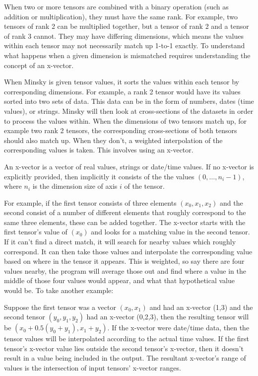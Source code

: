 When two or more tensors are combined with a binary operation (such 
as addition or multiplication), they must have the same rank. For example,
two tensors of rank 2 can be multiplied together, but a tensor of rank 2 and 
a tensor of rank 3 cannot. They may have differing dimensions, which means
the values within each tensor may not necessarily match up 1-to-1 exactly.
To understand what happens when a given dimension is mismatched requires 
understanding the concept of an x-vector\label{x-vector}.

When Minsky is given tensor values, it sorts the values within each tensor
by corresponding dimensions. For example, a rank 2 tensor would have its
values sorted into two sets of data. This data can be in the form of numbers,
dates (time values), or strings. Minsky will then look at cross-sections of the
datasets in order to process the values within. When the dimensions of two
tensors match up, for example two rank 2 tensors, the corresponding
cross-sections of both tensors should also match up. When they don't, a
weighted interpolation of the corresponding values is taken. This involves
using an x-vector. 

An x-vector is a vector of real values, strings or date/time values. 
If no x-vector is explicitly provided, then implicitly it consists of the the values
$(0,\ldots,n_i-1)$, where $n_i$ is the dimension size of axis $i$
of the tensor.

For example, if the first tensor consists of three elements $(x_0, x_1, x_2)$
and the second consist of a number of different elements that roughly
correspond to the same three elements, these can be added together.
The x-vector starts with the first tensor's value of $(x_0)$ and looks for a
matching value in the second tensor. If it can't find a direct match, it will
search for nearby values which roughly correspond. It can then take those
values and interpolate the corresponding value based on where in the tensor
it appears. This is weighted, so say there are four values nearby, the program
will average those out and find where a value in the middle of those four
values would appear, and what that hypothetical value would be. To take
another example:

Suppose the first tensor was a vector $(x_0,x_1)$ and had an
x-vector (1,3) and the second tensor $(y_0,y_1,y_2)$ had an x-vector
(0,2,3), then the resulting tensor will be $(x_0+0.5(y_0+y_1),
x_1+y_2)$. If the x-vector were date/time data, then the tensor values
will be interpolated according to the actual time values. If the first
tensor's x-vector value lies outside the second tensor's x-vector,
then it doesn't result in a value being included in the output. The
resultant x-vector's range of values is the intersection of input
tensors' x-vector ranges.

